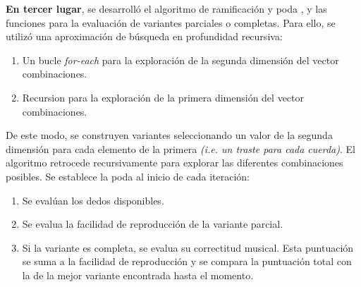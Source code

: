 \textbf{En tercer lugar}, se desarrolló el algoritmo de ramificación y poda , y las funciones para la evaluación de variantes parciales o completas. Para ello, se utilizó una  aproximación de búsqueda en profundidad recursiva:

\begin{enumerate}
    \item Un bucle \textit{for-each} para la exploración de la segunda dimensión del vector combinaciones.
    \item Recursion para la exploración de la primera dimensión del vector combinaciones.
\end{enumerate}

De este modo, se construyen variantes seleccionando un valor de la segunda dimensión para cada elemento de la primera \textit{(i.e. un traste para cada cuerda)}. El algoritmo retrocede recursivamente para explorar las diferentes combinaciones posibles. Se establece la poda al inicio de cada iteración:

\begin{enumerate}
    \item Se evalúan los dedos disponibles.
    \item Se evalua la facilidad de reproducción de la variante parcial.
    \item Si la variante es completa, se evalua su correctitud musical. Esta puntuación se suma a la facilidad de reproducción y se compara la puntuación total con la de la mejor variante encontrada hasta el momento.
\end{enumerate}

